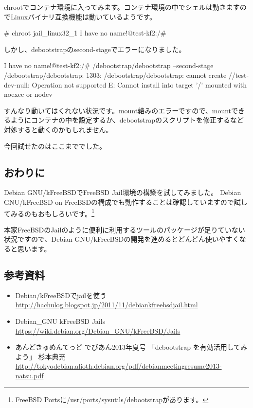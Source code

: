 \documentclass[mingoth,a4paper]{jsarticle}
\begin{document}
chrootでコンテナ環境に入ってみます。コンテナ環境の中でシェルは動きますのでLinuxバイナリ互換機能は動いているようです。

\begin{commandline}
# chroot jail_linux32_1
I have no name!@test-kf2:/# 
\end{commandline}

しかし、debootstrapのsecond-stageでエラーになりました。

\begin{commandline}
I have no name!@test-kf2:/# /debootstrap/debootstrap --second-stage
/debootstrap/debootstrap: 1303: /debootstrap/debootstrap: cannot create //test-dev-null: Operation not supported
E: Cannot install into target '/' mounted with noexec or nodev
\end{commandline}

すんなり動いてはくれない状況です。mount絡みのエラーですので、mountできるようにコンテナの中を設定するか、debootstrapのスクリプトを修正するなど対処すると動くのかもしれません。

今回試せたのはここまででした。

\subsection{おわりに}

Debian GNU/kFreeBSDでFreeBSD Jail環境の構築を試してみました。
Debian GNU/kFreeBSD on FreeBSDの構成でも動作することは確認していますので試してみるのもおもしろいです。\footnote{FreeBSD Portsに/usr/ports/sysutils/debootstrapがあります。}

本家FreeBSDのJailのように便利に利用するツールのパッケージが足りていない状況ですので、Debian GNU/kFreeBSDの開発を進めるとどんどん使いやすくなると思います。

\subsection{参考資料}
\begin{itemize}
  \item Debian/kFreeBSDでjailを使う \url{http://hachulog.blogspot.jp/2011/11/debiankfreebsdjail.html}
  \item Debian\_GNU kFreeBSD Jails  \url{https://wiki.debian.org/Debian\_GNU/kFreeBSD/Jails}
  \item あんどきゅめんてっど でびあん2013年夏号 「debootstrap を有効活用してみよう」 杉本典充 \url{http://tokyodebian.alioth.debian.org/pdf/debianmeetingresume2013-natsu.pdf}
\end{itemize}
\end{document}

